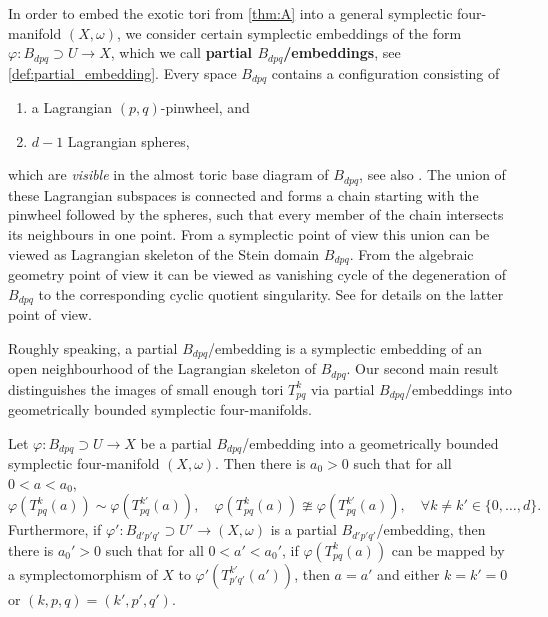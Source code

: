 \documentclass[12pt,a4paper,abstract=true,final]{scrartcl}
\begin{document}
In order to embed the exotic tori from \cref{thm:A} into a general symplectic four-manifold $(X,\omega)$, we consider certain symplectic embeddings of the form $\varphi \colon B_{dpq} \supset U \rightarrow X$, which we call \textbf{partial $B_{dpq}$\-/embeddings}, see \cref{def:partial_embedding}. Every space $B_{dpq}$ contains a configuration consisting of 
\begin{enumerate}
    \item a Lagrangian $(p,q)$-pinwheel, and
    \item $d-1$ Lagrangian spheres,
\end{enumerate}
which are \emph{visible} in the almost toric base diagram of $B_{dpq}$, see also \cite[Remark 7.10]{evans2021atfs}.
The union of these Lagrangian subspaces is connected and forms a chain starting with the pinwheel followed by the spheres, such that every member of the chain intersects its neighbours in one point.
From a symplectic point of view this union can be viewed as Lagrangian skeleton of the Stein domain $B_{dpq}$.
From the algebraic geometry point of view it can be viewed as vanishing cycle of the degeneration of $B_{dpq}$ to the corresponding cyclic quotient singularity.
See \cite{Eva19} for details on the latter point of view.

Roughly speaking, a partial $B_{dpq}$\-/embedding is a symplectic embedding of an open neighbourhood of the Lagrangian skeleton of $B_{dpq}$.
Our second main result distinguishes the images of small enough tori $T^k_{pq}$ via partial $B_{dpq}$\-/embeddings into geometrically bounded symplectic four-manifolds. 

\begin{maintheorem}
    \label{thm:B}
    Let $\varphi \colon B_{dpq} \supset U \rightarrow X$ be a partial $B_{dpq}$\-/embedding into a geometrically bounded symplectic four-manifold $(X,\omega)$.
Then there is $a_0 > 0$ such that for all $0 < a < a_0$, 
    \begin{equation}
        \varphi(T^k_{pq}(a)) \sim \varphi(T^{k'}_{pq}(a)), \quad 
        \varphi(T^k_{pq}(a)) \ncong \varphi(T^{k'}_{pq}(a)), \quad
        \forall k \neq k' \in \{0,\ldots,d\}.
    \end{equation}
    Furthermore, if $\varphi' \colon B_{d'p'q'} \supset U' \rightarrow (X,\omega)$ is a partial $B_{d'p'q'}$\-/embedding, then there is $a_0' > 0$ such that for all $0<a' < a_0'$, if $\varphi(T^k_{pq}(a))$ can be mapped by a symplectomorphism of $X$ to $\varphi'(T^{k'}_{p'q'}(a'))$, then $a=a'$ and either $k = k' = 0$ or $(k,p,q) = (k',p',q')$. 
\end{maintheorem}
\end{document}
